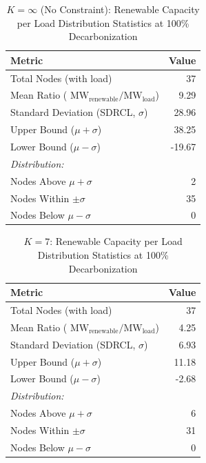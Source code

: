 \documentclass[preprint,12pt,nopreprintline]{elsarticle}
\begin{document}
\begin{table}[htbp]
\centering
\caption{$K = \infty$ (No Constraint): Renewable Capacity per Load Distribution Statistics at 100\% Decarbonization}
\label{tab:capacity_load_distribution_kinf}
\begin{tabular}{lr}
\toprule
\textbf{Metric} & \textbf{Value} \\
\midrule
Total Nodes (with load) & 37 \\
Mean Ratio ($\text{ MW}_{\text{renewable}}/\text{MW}_{\text{load}}$) & 9.29 \\
Standard Deviation (SDRCL, $\sigma$) & 28.96 \\
Upper Bound ($\mu + \sigma$) & 38.25 \\
Lower Bound ($\mu - \sigma$) & -19.67 \\
\midrule
\textit{Distribution:} & \\
\quad Nodes Above $\mu + \sigma$ & 2 \\
\quad Nodes Within $\pm\sigma$ & 35 \\
\quad Nodes Below $\mu - \sigma$ & 0 \\
\bottomrule
\end{tabular}
\end{table}


\begin{table}[htbp]
\centering
\caption{$K = 7$: Renewable Capacity per Load Distribution Statistics at 100\% Decarbonization}
\label{tab:capacity_load_distribution_k7}
\begin{tabular}{lr}
\toprule
\textbf{Metric} & \textbf{Value} \\
\midrule
Total Nodes (with load) & 37 \\
Mean Ratio ($\text{ MW}_{\text{renewable}}/\text{MW}_{\text{load}}$) & 4.25 \\
Standard Deviation (SDRCL, $\sigma$) & 6.93 \\
Upper Bound ($\mu + \sigma$) & 11.18 \\
Lower Bound ($\mu - \sigma$) & -2.68 \\
\midrule
\textit{Distribution:} & \\
\quad Nodes Above $\mu + \sigma$ & 6 \\
\quad Nodes Within $\pm\sigma$ & 31 \\
\quad Nodes Below $\mu - \sigma$ & 0 \\
\bottomrule
\end{tabular}
\end{table}
\end{document}
